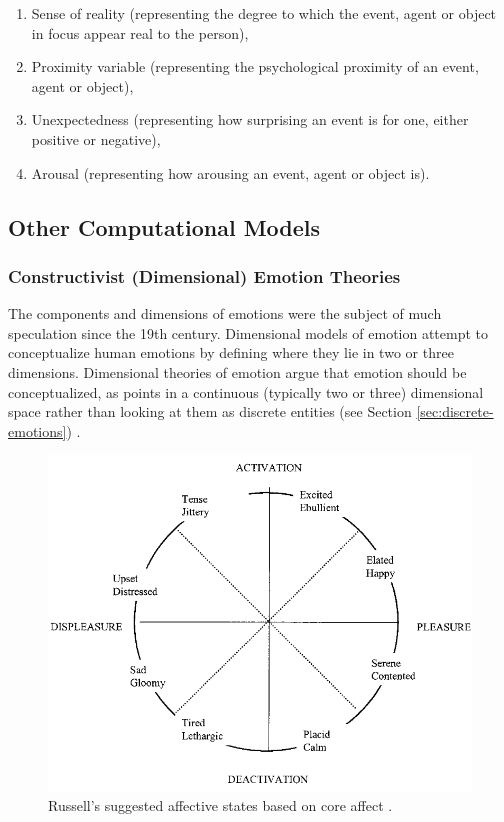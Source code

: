 \documentclass[12pt]{report}
\begin{document}
\begin{enumerate}
	\item Sense of reality (representing the degree to which the event, agent or
	object in focus appear real to the person),

	\item Proximity variable (representing the psychological proximity of an event,
	agent or object),

	\item Unexpectedness (representing how surprising an event is for one, either
	positive or negative),

	\item Arousal (representing how arousing an event, agent or object is).
\end{enumerate}

\subsection{Other Computational Models}

\subsubsection{Constructivist (Dimensional) Emotion Theories}
\label{sec:dimensional-emotions}

The components and dimensions of emotions were the subject of much speculation
since the 19th century. Dimensional models of emotion attempt to conceptualize
human emotions by defining where they lie in two or three dimensions.
Dimensional theories of emotion argue that emotion should be conceptualized, as
points in a continuous (typically two or three) dimensional space rather than
looking at them as discrete entities (see Section \ref{sec:discrete-emotions})
\cite{carver:affect-behavior} \cite{mehrabian-russell:pad}
\cite{russell:core-affect} \cite{watson:consensual-structure-mood}. 

\begin{figure}[tbh]
  \center
  \includegraphics[width=.7\textwidth]{figure/core-affect.png}
  \caption{Russell's suggested affective states based on core affect
  \cite{russell:core-affect}.}
  \label{fig:core-affect}
\end{figure}
\end{document}
